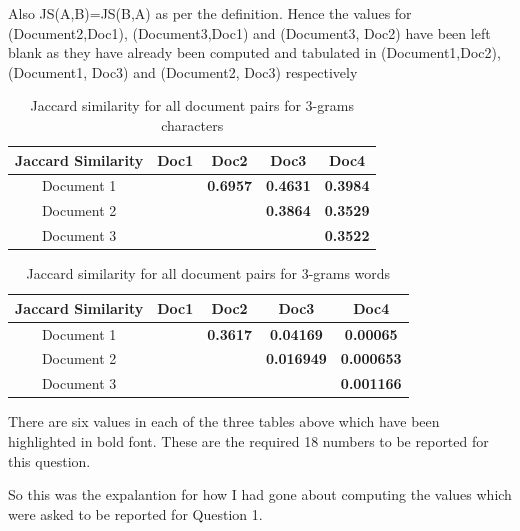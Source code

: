 \documentclass[11pt]{article}
\begin{document}
\begin{itemize}
	Also JS(A,B)=JS(B,A) as per the definition. Hence the values for (Document2,Doc1), (Document3,Doc1) and (Document3, Doc2) have been left blank as they have already been computed and tabulated in (Document1,Doc2),(Document1, Doc3) and (Document2, Doc3) respectively
	
	\begin{table}[h]
		\centering
		\begin{tabular}{|c|c|c|c|c|}
			\hline
			\textbf{Jaccard Similarity}  & \textbf{Doc1} & \textbf{Doc2} & \textbf{Doc3} & \textbf{Doc4}  \\
			\hline
			Document 1&    &  \textbf{0.6957}   &  \textbf{0.4631}     &  \textbf{0.3984}  \\
			\hline
			Document 2&      &      &  \textbf{0.3864}    &  \textbf{0.3529}    \\
			\hline
			Document 3&      &     &    &  \textbf{0.3522}   \\
			\hline
		\end{tabular}
		\caption{Jaccard similarity for all document pairs for  3-grams characters}
		\label{t2}
	\end{table}
	

	
	\begin{table}[h]
		\centering
		\begin{tabular}{|c|c|c|c|c|}
			\hline
		\textbf{Jaccard Similarity}  & \textbf{Doc1} & \textbf{Doc2} & \textbf{Doc3} & \textbf{Doc4}  \\
		\hline
			Document 1 &   &  \textbf{0.3617}   & \textbf{ 0.04169 }    &  \textbf{0.00065}  \\
			\hline
			Document 2 &      &      &  \textbf{0.016949}    &  \textbf{0.000653}    \\
			\hline
			Document 3 &      &     &    &  \textbf{0.001166}  \\
			\hline
		\end{tabular}
		\caption{Jaccard similarity for all document pairs for  3-grams words}
		\label{t2}
	\end{table}
	
		There are six values in each of the three tables above which have been highlighted in bold font. These are the required 18 numbers to be reported for this question.
		
		So this was the expalantion for how I had gone about computing the values which were asked to be reported for Question 1.
	
	\pagebreak
	\end{itemize}
\end{document}
